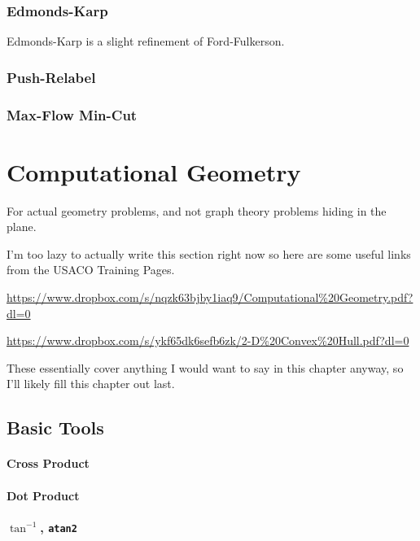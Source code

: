 \documentclass[11pt]{book}
\begin{document}
\subsection{Edmonds-Karp}

Edmonds-Karp is a slight refinement of Ford-Fulkerson.

\subsection{Push-Relabel}

\subsection{Max-Flow Min-Cut}

\chapter{Computational Geometry}

For actual geometry problems, and not graph theory problems hiding in the plane.

I'm too lazy to actually write this section right now so here are some useful links from the USACO Training Pages.

\url{https://www.dropbox.com/s/nqzk63bjby1iaq9/Computational%20Geometry.pdf?dl=0}

\url{https://www.dropbox.com/s/ykf65dk6sefb6zk/2-D%20Convex%20Hull.pdf?dl=0}

These essentially cover anything I would want to say in this chapter anyway, so I'll likely fill this chapter out last.

\section{Basic Tools}

\subsubsection{Cross Product}

\subsubsection{Dot Product}

\subsubsection{$\tan^{-1}$, \texttt{atan2}}
\end{document}

